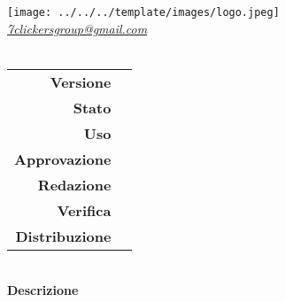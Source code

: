 \thispagestyle{empty}
\renewcommand{\arraystretch}{1.3}

\begin{titlepage}
	\begin{center}
		
	\texttt{[image: ../../../template/images/logo.jpeg]}
	\\[1cm]
	\href{mailto:7clickersgroup@gmail.com}		      	
	{\large{\textit{7clickersgroup@gmail.com} } }\\[2.5cm]
	\Huge \textbf{\doctitle} \\[1cm]
	 \large
			 \begin{tabular}{r|l}
                        \textbf{Versione} & \rev{} \\
                        \textbf{Stato} & \stato{} \\
                        \textbf{Uso} & \uso{} \\                         
                        \textbf{Approvazione} & \approv{} \\                      
                        \textbf{Redazione} & \red{} \\ 
                        \textbf{Verifica} &  \ver{} \\                         
                        \textbf{Distribuzione} & \parbox[t]{5cm}{ \dest{} }
                \end{tabular} 
                \\[3.5cm]
                \large \textbf{Descrizione} \\ \describedoc{} 
     \end{center}
\end{titlepage}